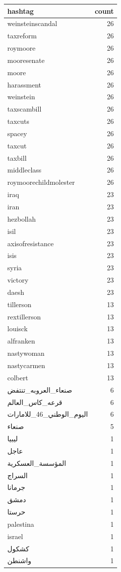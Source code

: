\begin{tabular}{lr}
\toprule
hashtag & count \\
\midrule
weinsteinscandal & 26 \\
taxreform & 26 \\
roymoore & 26 \\
mooresenate & 26 \\
moore & 26 \\
harassment & 26 \\
weinstein & 26 \\
taxscambill & 26 \\
taxcuts & 26 \\
spacey & 26 \\
taxcut & 26 \\
taxbill & 26 \\
middleclass & 26 \\
roymoorechildmolester & 26 \\
iraq & 23 \\
iran & 23 \\
hezbollah & 23 \\
isil & 23 \\
axisofresistance & 23 \\
isis & 23 \\
syria & 23 \\
victory & 23 \\
daesh & 23 \\
tillerson & 13 \\
rextillerson & 13 \\
louisck & 13 \\
alfranken & 13 \\
nastywoman & 13 \\
nastycarmen & 13 \\
colbert & 13 \\
صنعاء\_العروبه\_تنتفض & 6 \\
قرعه\_كاس\_العالم & 6 \\
اليوم\_الوطني\_46\_للامارات & 6 \\
صنعاء & 5 \\
ليبيا & 1 \\
عاجل & 1 \\
المؤسسة\_العسكرية & 1 \\
السراج & 1 \\
جرمانا & 1 \\
دمشق & 1 \\
حرستا & 1 \\
palestina & 1 \\
israel & 1 \\
كشكول & 1 \\
واشنطن & 1 \\
\bottomrule
\end{tabular}
